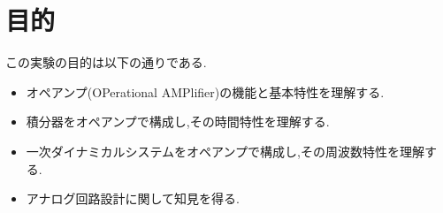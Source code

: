 \section{目的}
この実験の目的は以下の通りである.
\begin{itemize}
  \item オペアンプ(OPerational AMPlifier)の機能と基本特性を理解する.
  \item 積分器をオペアンプで構成し,その時間特性を理解する.
  \item 一次ダイナミカルシステムをオペアンプで構成し,その周波数特性を理解する.
  \item アナログ回路設計に関して知見を得る.
\end{itemize}
